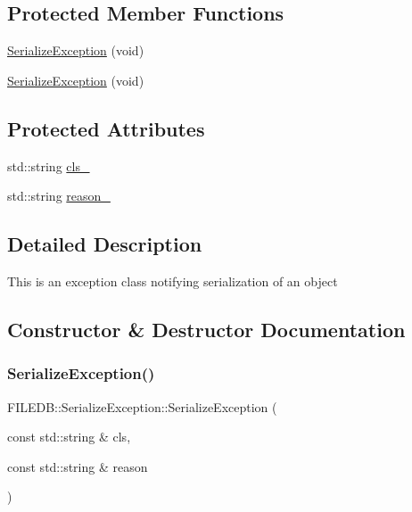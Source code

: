 \subsection*{Protected Member Functions}
\begin{DoxyCompactItemize}
\item 
\mbox{\hyperlink{classFILEDB_1_1SerializeException_a84b139cba956139f16f27094d53fd68a}{Serialize\+Exception}} (void)
\item 
\mbox{\hyperlink{classFILEDB_1_1SerializeException_a84b139cba956139f16f27094d53fd68a}{Serialize\+Exception}} (void)
\end{DoxyCompactItemize}
\subsection*{Protected Attributes}
\begin{DoxyCompactItemize}
\item 
std\+::string \mbox{\hyperlink{classFILEDB_1_1SerializeException_ad82d67694aa41ca34cf81226c07f2b42}{cls\+\_\+}}
\item 
std\+::string \mbox{\hyperlink{classFILEDB_1_1SerializeException_aa9e4b477e71cc170bda3a4ff2a4822de}{reason\+\_\+}}
\end{DoxyCompactItemize}


\subsection{Detailed Description}
This is an exception class notifying serialization of an object 

\subsection{Constructor \& Destructor Documentation}
\mbox{\label{classFILEDB_1_1SerializeException_aab805dbcb5d495f039ec743780e5e1a2}} 
\subsubsection{\texorpdfstring{SerializeException()}{SerializeException()}\hspace{0.1cm}{\footnotesize\ttfamily [1/6]}}
{\footnotesize\ttfamily F\+I\+L\+E\+D\+B\+::\+Serialize\+Exception\+::\+Serialize\+Exception (\begin{DoxyParamCaption}\item[{const std\+::string \&}]{cls,  }\item[{const std\+::string \&}]{reason }\end{DoxyParamCaption})}

